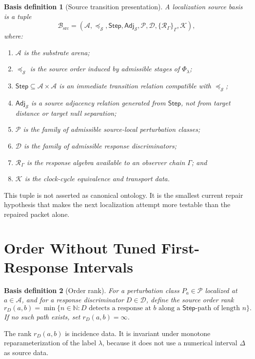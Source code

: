\documentclass[11pt]{article}
\newcommand{\Sub}{\mathcal{A}}
\newcommand{\PhiFlow}{\Phi_{\lambda}}
\newcommand{\Step}{\mathsf{Step}}
\newcommand{\Adj}{\mathsf{Adj}_{\mathcal{S}}}
\newcommand{\RespAlg}{\mathcal{R}_{\Gamma}}
\newcommand{\Basis}{\mathcal{B}_{\mathrm{src}}}
\newtheorem{basisdefinition}{Basis definition}
\begin{document}
\begin{basisdefinition}[Source transition presentation]
A localization source basis is a tuple
\[
\Basis =
(\Sub,\preceq_{\mathcal{S}},\Step,\Adj,\mathcal{P},
\mathcal{D},\{\RespAlg\}_{\Gamma},\mathcal{K}),
\]
where:
\begin{enumerate}
    \item \(\Sub\) is the substrate arena;
    \item \(\preceq_{\mathcal{S}}\) is the source order induced by admissible
    stages of \(\PhiFlow\);
    \item \(\Step\subseteq\Sub\times\Sub\) is an immediate transition relation
    compatible with \(\preceq_{\mathcal{S}}\);
    \item \(\Adj\) is a source adjacency relation generated from \(\Step\), not
    from target distance or target null separation;
    \item \(\mathcal{P}\) is the family of admissible source-local
    perturbation classes;
    \item \(\mathcal{D}\) is the family of admissible response discriminators;
    \item \(\RespAlg\) is the response algebra available to an observer chain
    \(\Gamma\); and
    \item \(\mathcal{K}\) is the clock-cycle equivalence and transport data.
\end{enumerate}
\end{basisdefinition}

This tuple is not asserted as canonical ontology. It is the smallest current
repair hypothesis that makes the next localization attempt more testable than
the repaired packet alone.

\section{Order Without Tuned First-Response Intervals}

\begin{basisdefinition}[Order rank]
For a perturbation class \(P_a\in\mathcal{P}\) localized at \(a\in\Sub\), and
for a response discriminator \(D\in\mathcal{D}\), define the source order rank
\[
r_D(a,b)
=
\min\{n\in\mathbb{N}: D \text{ detects a response at } b
\text{ along a } \Step\text{-path of length } n\}.
\]
If no such path exists, set \(r_D(a,b)=\infty\).
\end{basisdefinition}

The rank \(r_D(a,b)\) is incidence data. It is invariant under monotone
reparameterization of the label \(\lambda\), because it does not use a
numerical interval \(\Delta\) as source data.
\end{document}

